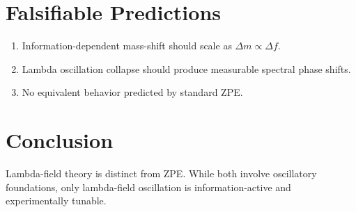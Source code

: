 \documentclass[11pt]{article}
\begin{document}
\section{Falsifiable Predictions}
\begin{enumerate}
\item Information-dependent mass-shift should scale as $\Delta m \propto \Delta f$.
\item Lambda oscillation collapse should produce measurable spectral phase shifts.
\item No equivalent behavior predicted by standard ZPE.
\end{enumerate}

\section{Conclusion}
Lambda-field theory is distinct from ZPE. While both involve oscillatory foundations, only lambda-field oscillation is information-active and experimentally tunable.



\end{document}
